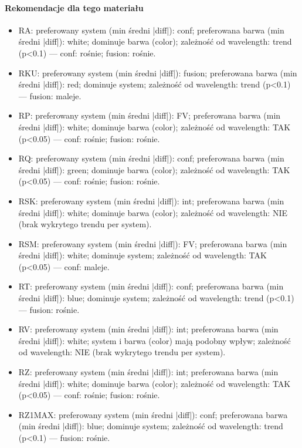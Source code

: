 \documentclass[
  10pt,
]{article}
\begin{document}
\paragraph{Rekomendacje dla tego materiału}
\begin{itemize}
\item RA: preferowany system (min średni |diff|): conf; preferowana barwa (min średni |diff|): white; dominuje barwa (color); zależność od wavelength: trend (p<0.1) — conf: rośnie; fusion: rośnie.
\item RKU: preferowany system (min średni |diff|): fusion; preferowana barwa (min średni |diff|): red; dominuje system; zależność od wavelength: trend (p<0.1) — fusion: maleje.
\item RP: preferowany system (min średni |diff|): FV; preferowana barwa (min średni |diff|): white; dominuje barwa (color); zależność od wavelength: TAK (p<0.05) — conf: rośnie; fusion: rośnie.
\item RQ: preferowany system (min średni |diff|): conf; preferowana barwa (min średni |diff|): green; dominuje barwa (color); zależność od wavelength: TAK (p<0.05) — conf: rośnie; fusion: rośnie.
\item RSK: preferowany system (min średni |diff|): int; preferowana barwa (min średni |diff|): white; dominuje barwa (color); zależność od wavelength: NIE (brak wykrytego trendu per system).
\item RSM: preferowany system (min średni |diff|): FV; preferowana barwa (min średni |diff|): white; dominuje system; zależność od wavelength: TAK (p<0.05) — conf: maleje.
\item RT: preferowany system (min średni |diff|): conf; preferowana barwa (min średni |diff|): blue; dominuje system; zależność od wavelength: trend (p<0.1) — fusion: rośnie.
\item RV: preferowany system (min średni |diff|): int; preferowana barwa (min średni |diff|): white; system i barwa (color) mają podobny wpływ; zależność od wavelength: NIE (brak wykrytego trendu per system).
\item RZ: preferowany system (min średni |diff|): int; preferowana barwa (min średni |diff|): white; dominuje barwa (color); zależność od wavelength: TAK (p<0.05) — conf: rośnie; fusion: rośnie.
\item RZ1MAX: preferowany system (min średni |diff|): conf; preferowana barwa (min średni |diff|): blue; dominuje system; zależność od wavelength: trend (p<0.1) — fusion: rośnie.
\end{itemize}
\end{document}
